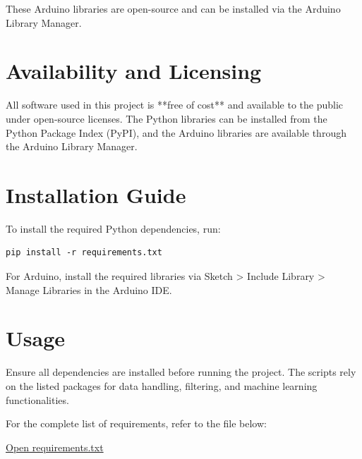 These Arduino libraries are open-source and can be installed via the Arduino Library Manager.

\section{Availability and Licensing}
All software used in this project is **free of cost** and available to the public under open-source licenses. The Python libraries can be installed from the Python Package Index (PyPI), and the Arduino libraries are available through the Arduino Library Manager.

\section{Installation Guide}
To install the required Python dependencies, run:

\begin{verbatim}
pip install -r requirements.txt
\end{verbatim}

For Arduino, install the required libraries via Sketch > Include Library > Manage Libraries in the Arduino IDE.

\section{Usage}
Ensure all dependencies are installed before running the project. The scripts rely on the listed packages for data handling, filtering, and machine learning functionalities.

For the complete list of requirements, refer to the file below:

\href{run:../Code/requirements.txt}{Open requirements.txt}
